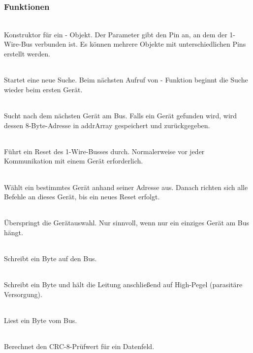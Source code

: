 	\subsubsection{Funktionen}
	\begin{description}
		 
		\item {} \\ Konstruktor für ein  - Objekt. Der Parameter  gibt den Pin an, an dem der 1-Wire-Bus verbunden ist. Es können mehrere Objekte mit unterschiedlichen Pins erstellt werden.
		
		\item {} \\ Startet eine neue Suche. Beim nächsten Aufruf von  - Funktion beginnt die Suche wieder beim ersten Gerät.
		
		\item {} \\ Sucht nach dem nächsten Gerät am Bus. 
		Falls ein Gerät gefunden wird, wird dessen 8-Byte-Adresse in addrArray gespeichert und  zurückgegeben.

		\item {} \\ Führt ein Reset des 1-Wire-Busses durch. 
		Normalerweise vor jeder Kommunikation mit einem Gerät erforderlich.
		
		\item {} \\ Wählt ein bestimmtes Gerät anhand seiner Adresse aus.  Danach richten sich alle Befehle an dieses Gerät, bis ein neues Reset erfolgt.
		
		\item {} \\ Überspringt die Gerätauswahl. Nur sinnvoll, wenn nur ein einziges Gerät am Bus hängt.
		
		\item {} \\ Schreibt ein Byte auf den Bus.
		
		\item {} \\ Schreibt ein Byte und hält die Leitung anschlie{\ss}end auf High-Pegel (parasitäre Versorgung).
		
		\item {} \\ Liest ein Byte vom Bus.
		
		\item {} \\	Berechnet den CRC-8-Prüfwert für ein Datenfeld.
		
	\end{description}
	
